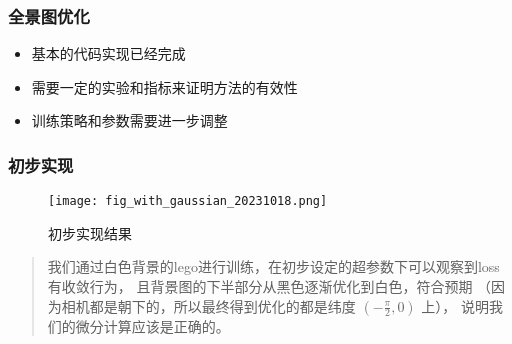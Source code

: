
\begin{frame}
    \frametitle{全景图优化}
    \begin{itemize}
        \item 基本的代码实现已经完成
        \item 需要一定的实验和指标来证明方法的有效性
        \item 训练策略和参数需要进一步调整
    \end{itemize}
\end{frame}

\begin{frame}
    \frametitle{初步实现}
    \begin{figure}
        \texttt{[image: fig\_with\_gaussian\_20231018.png]}
        \caption[short]{初步实现结果}
    \end{figure}
    \begin{quote}
        我们通过白色背景的lego进行训练，在初步设定的超参数下可以观察到loss有收敛行为，
        且背景图的下半部分从黑色逐渐优化到白色，符合预期
        （因为相机都是朝下的，所以最终得到优化的都是纬度 $(-\frac{\pi}{2}, 0)$ 上），
        说明我们的微分计算应该是正确的。
    \end{quote}
\end{frame}